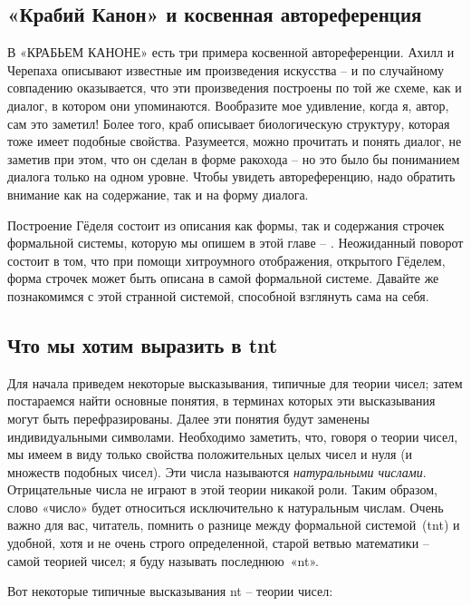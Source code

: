 \documentclass[../main.tex]{subfiles}
\begin{document}

\subsection{«Крабий Канон» и косвенная автореференция}

В «КРАБЬЕМ КАНОНЕ» есть три примера косвенной автореференции. Ахилл и Черепаха описывают известные им произведения искусства \--- и по случайному совпадению оказывается, что эти произведения построены по той же схеме, как и диалог, в котором они упоминаются. Вообразите мое удивление, когда я, автор, сам это заметил! Более того, краб описывает биологическую структуру, которая тоже имеет подобные свойства. Разумеется, можно прочитать и понять диалог, не заметив при этом, что он сделан в форме ракохода \--- но это было бы пониманием диалога только на одном уровне. Чтобы увидеть автореференцию, надо обратить внимание как на содержание, так и на форму диалога.

Построение Гёделя состоит из описания как формы, так и содержания строчек формальной системы, которую мы опишем в этой главе \--- . Неожиданный поворот состоит в том, что при помощи хитроумного отображения, открытого Гёделем, форма строчек может быть описана в самой формальной системе. Давайте же познакомимся с этой странной системой, способной взглянуть сама на себя.


\subsection{Что мы хотим выразить в \acs{tnt}}

Для начала приведем некоторые высказывания, типичные для теории чисел; затем постараемся найти основные понятия, в терминах которых эти высказывания могут быть перефразированы. Далее эти понятия будут заменены индивидуальными символами. Необходимо заметить, что, говоря о теории чисел, мы имеем в виду только свойства положительных целых чисел и нуля (и множеств подобных чисел). Эти числа называются \emph{натуральными числами}. Отрицательные числа не играют в этой теории никакой роли. Таким образом, слово «число» будет относиться исключительно к натуральным числам. Очень важно для вас, читатель, помнить о разнице между формальной системой~(\acs{tnt}) и удобной, хотя и не очень строго определенной, старой ветвью математики \--- самой теорией чисел; я буду называть последнюю~«\acs{nt}».

Вот некоторые типичные высказывания \acs{nt} \--- теории чисел:
\end{document}
